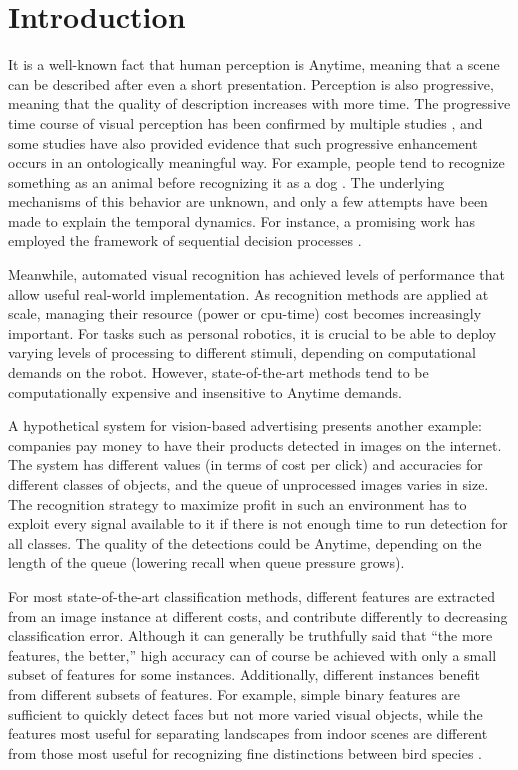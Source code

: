 \chapter{Introduction}\label{sec:introduction}

It is a well-known fact that human perception is Anytime, meaning that a scene can be described after even a short presentation.
Perception is also progressive, meaning that the quality of description increases with more time.
The progressive time course of visual perception has been confirmed by multiple studies \parencite{Vanrullen-1996,Fei-Fei-Vision-2007}, and some studies have also provided evidence that such progressive enhancement occurs in an ontologically meaningful way.
For example, people tend to recognize something as an animal before recognizing it as a dog \parencite{Mace-PloS-2009}.
The underlying mechanisms of this behavior are unknown, and only a few attempts have been made to explain the temporal dynamics.
For instance, a promising work has employed the framework of sequential decision processes \parencite{Hegde-Neuro-2008}.

Meanwhile, automated visual recognition has achieved levels of performance that allow useful real-world implementation.
As recognition methods are applied at scale, managing their resource (power or cpu-time) cost becomes increasingly important.
For tasks such as personal robotics, it is crucial to be able to deploy varying levels of processing to different stimuli, depending on computational demands on the robot.
However, state-of-the-art methods tend to be computationally expensive and insensitive to Anytime demands.

A hypothetical system for vision-based advertising presents another example: companies pay money to have their products detected in images on the internet.
The system has different values (in terms of cost per click) and accuracies for different classes of objects, and the queue of unprocessed images varies in size.
The recognition strategy to maximize profit in such an environment has to exploit every signal available to it if there is not enough time to run detection for all classes.
The quality of the detections could be Anytime, depending on the length of the queue (lowering recall when queue pressure grows).

For most state-of-the-art classification methods, different features are extracted from an image instance at different costs, and contribute differently to decreasing classification error.
Although it can generally be truthfully said that ``the more features, the better,'' high accuracy can of course be achieved with only a small subset of features for some instances.
Additionally, different instances benefit from different subsets of features.
For example, simple binary features are sufficient to quickly detect faces \parencite{Viola-IJCV-2004} but not more varied visual objects, while the features most useful for separating landscapes from indoor scenes \parencite{Xiao-CVPR-2010} are different from those most useful for recognizing fine distinctions between bird species \parencite{Farrell-ICCV-2011}.

